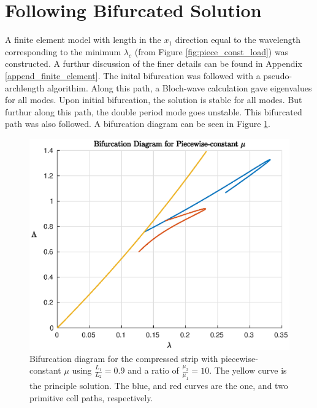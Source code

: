 \documentclass[11pt]{report}
\begin{document}
\section{Following Bifurcated Solution}
A finite element model with length in the $x_1$ direction equal to the wavelength corresponding to the minimum $\lambda_c$ (from Figure \ref{fig:piece_const_load}) was constructed. A furthur discussion of the finer details can be found in Appendix \ref{append_finite_element}. The inital bifurcation was followed with a pseudo-archlength algorithim. Along this path, a Bloch-wave calculation gave eigenvalues for all modes. Upon initial bifurcation, the solution is stable for all modes. But furthur along this path, the double period mode goes unstable. This bifurcated path was also followed. A bifurcation diagram can be seen in Figure \ref{fig:piece_const_bif_diagram}.
\begin{figure}[!htb]
	\begin{center}
		\includegraphics[scale=0.7]{bif_diagram_pieceConst_10_9}
	\end{center}
	\captionsetup{format=hang}
	\caption{Bifurcation diagram for the compressed strip with piecewise-constant $\mu$ using $\frac{L_1}{L_2} = 0.9$ and a ratio of $\frac{\mu_2}{\mu_1} = 10$. The yellow curve is the principle solution. The blue, and red curves are the one, and two primitive cell paths, respectively.}
	\label{fig:piece_const_bif_diagram}
\end{figure}
\end{document}

